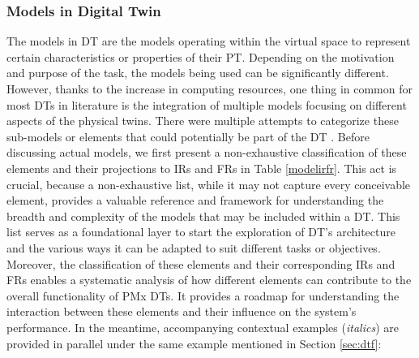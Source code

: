\documentclass[runningheads]{llncs}
\begin{document}
\subsubsection{Models in Digital Twin} \label{models}
The models in DT are the models operating within the virtual space to represent certain characteristics or properties of their PT. Depending on the motivation and purpose of the task, the models being used can be significantly different. However, thanks to the increase in computing resources, one thing in common for most DTs in literature is the integration of multiple models focusing on different aspects of the physical twins. There were multiple attempts to categorize these sub-models or elements that could potentially be part of the DT \cite{liu2021biomimicry,qi2021smart}. Before discussing actual models, we first present a non-exhaustive classification of these elements and their projections to IRs and FRs in Table \ref{modelirfr}. This act is crucial, because a non-exhaustive list, while it may not capture every conceivable element, provides a valuable reference and framework for understanding the breadth and complexity of the models that may be included within a DT. This list serves as a foundational layer to start the exploration of DT's architecture and the various ways it can be adapted to suit different tasks or objectives. Moreover, the classification of these elements and their corresponding IRs and FRs enables a systematic analysis of how different elements can contribute to the overall functionality of PMx DTs. It provides a roadmap for understanding the interaction between these elements and their influence on the system's performance. In the meantime, accompanying contextual examples (\textit{italics}) are provided in parallel under the same example mentioned in Section \ref{sec:dtf}:
\end{document}
